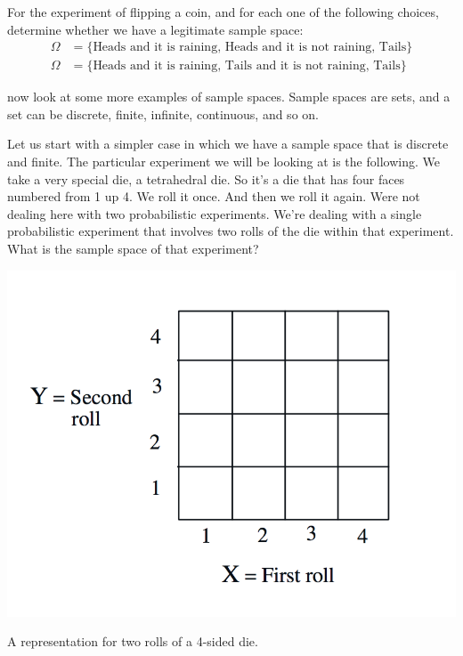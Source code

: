 \documentclass{tufte-handout}
\begin{document}
 For the experiment of flipping a coin, and for each one of the following choices, determine whether we have a legitimate sample space:
\begin{align}
\Omega &= \{ \text{Heads and it is raining, Heads and it is not raining, Tails}\} \\
\Omega &= \{ \text{Heads and it is raining, Tails and it is not raining, Tails}\}
\end{align}

\vspace{0.5cm}

 now look at some more examples of sample spaces. Sample spaces are sets, and a set can be
discrete, finite, infinite, continuous, and so on.

 Let us start with a simpler case in which we have a
sample space that is discrete and finite.
The particular experiment we will be looking at is the following. We take a very special die, a tetrahedral
die. So it's a die that has four faces numbered from 1 up 4. We roll it once. And then we roll it again.
Were not dealing here with two probabilistic experiments. We're dealing with a single probabilistic
experiment that involves two rolls of the die within that experiment. What is the sample space of that
experiment? 

\begin{marginfigure}
  \includegraphics[width=\linewidth]{Dice2}
  \caption{A representation for two rolls of a 4-sided die.}
  \label{fig:marginfig}
\end{marginfigure}
\end{document}
